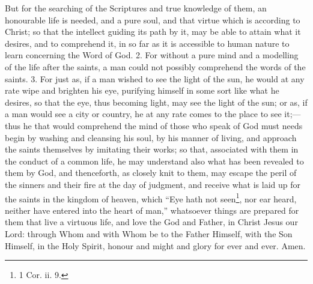But for the searching of the Scriptures and true knowledge of them, an honourable life is needed, and a pure soul, and that virtue which is according to Christ; so that the intellect guiding its path by it, may be able to attain what it desires, and to comprehend it, in so far as it is accessible to human nature to learn concerning the Word of God. 2. For without a pure mind and a modelling of the life after the saints, a man could not possibly comprehend the words of the saints. 3. For just as, if a man wished to see the light of the sun, he would at any rate wipe and brighten his eye, purifying himself in some sort like what he desires, so that the eye, thus becoming light, may see the light of the sun; or as, if a man would see a city or country, he at any rate comes to the place to see it;—thus he that would comprehend the mind of those who speak of God must needs begin by washing and cleansing his soul, by his manner of living, and approach the saints themselves by imitating their works; so that, associated with them in the conduct of a common life, he may understand also what has been revealed to them by God, and thenceforth, as closely knit to them, may escape the peril of the sinners and their fire at the day of judgment, and receive what is laid up for the saints in the kingdom of heaven, which “Eye hath not seen\footnote{1 Cor. ii. 9.}, nor ear heard, neither have entered into the heart of man,” whatsoever things are prepared for them that live a virtuous life, and love the God and Father, in Christ Jesus our Lord: through Whom and with Whom be to the Father Himself, with the Son Himself, in the Holy Spirit, honour and might and glory for ever and ever. Amen.
